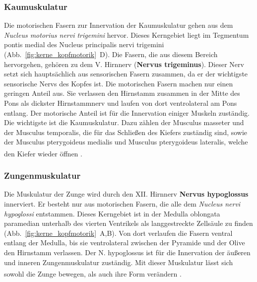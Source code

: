 \documentclass[12pt,a4paper,pdftex]{article}
\begin{document}
\subsubsection*{Kaumuskulatur} 
Die motorischen Fasern zur Innervation der Kaumuskulatur gehen aus dem \textit{Nucleus motorius nervi trigemini}  hervor. Dieses Kerngebiet liegt im Tegmentum pontis medial des Nucleus principalis nervi trigemini (Abb.~\ref{fig:kerne_kopfmotorik}~D). Die Fasern, die aus diesem Bereich hervorgehen, gehören zu dem V. Hirnnerv (\textbf{Nervus trigeminus}). Dieser Nerv setzt sich hauptsächlich aus sensorischen Fasern zusammen, da er der wichtigste sensorische Nervs des Kopfes ist. Die motorischen Fasern machen nur einen geringen Anteil aus. Sie verlassen den Hirnstamm zusammen in der Mitte des Pons als dickster Hirnstammnerv und laufen von dort ventrolateral am Pons entlang. Der motorische Anteil ist für die Innervation einiger Muskeln zuständig. Die wichtigste ist die Kaumuskulatur. Dazu zählen der Musculus masseter und der Musculus temporalis, die für das Schließen des Kiefers zuständig sind, sowie der Musculus pterygoideus medialis und Musculus pterygoideus lateralis, welche den Kiefer wieder öffnen \textsuperscript{\cite[10]{crossman2014neuroanatomy}}.

\subsubsection*{Zungenmuskulatur}
Die Muskulatur der Zunge wird durch den XII. Hirnnerv \textbf{Nervus hypoglossus}  innerviert. Er besteht nur aus motorischen Fasern, die alle dem \textit{Nucleus nervi hypoglossi}  entstammen. Dieses Kerngebiet ist in der Medulla oblongata paramedian unterhalb des vierten Ventrikels als langgestreckte Zellsäule zu finden (Abb.~\ref{fig:kerne_kopfmotorik}~A,B). Von dort verlaufen die Fasern ventral entlang der Medulla, bis sie ventrolateral zwischen der Pyramide und der Olive den Hirnstamm verlassen. Der N. hypoglossus ist für die Innervation der äußeren und inneren Zungenmuskulatur zuständig. Mit dieser Muskulatur lässt sich sowohl die Zunge bewegen, als auch ihre Form verändern \textsuperscript{\cite[10]{crossman2014neuroanatomy}}.
\end{document}
